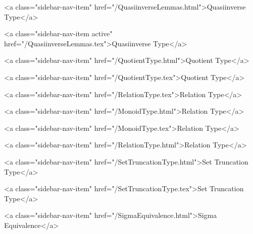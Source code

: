       
    
      
        
          <a class="sidebar-nav-item" href="/QuasiinverseLemmas.html">Quasiinverse Type</a>
        
      
    
      
        
          <a class="sidebar-nav-item active" href="/QuasiinverseLemmas.tex">Quasiinverse Type</a>
        
      
    
      
        
          <a class="sidebar-nav-item" href="/QuotientType.html">Quotient Type</a>
        
      
    
      
        
          <a class="sidebar-nav-item" href="/QuotientType.tex">Quotient Type</a>
        
      
    
      
        
          <a class="sidebar-nav-item" href="/RelationType.tex">Relation Type</a>
        
      
    
      
        
          <a class="sidebar-nav-item" href="/MonoidType.html">Relation Type</a>
        
      
    
      
        
          <a class="sidebar-nav-item" href="/MonoidType.tex">Relation Type</a>
        
      
    
      
        
          <a class="sidebar-nav-item" href="/RelationType.html">Relation Type</a>
        
      
    
      
        
          <a class="sidebar-nav-item" href="/SetTruncationType.html">Set Truncation Type</a>
        
      
    
      
        
          <a class="sidebar-nav-item" href="/SetTruncationType.tex">Set Truncation Type</a>
        
      
    
      
        
          <a class="sidebar-nav-item" href="/SigmaEquivalence.html">Sigma Equivalence</a>
        
